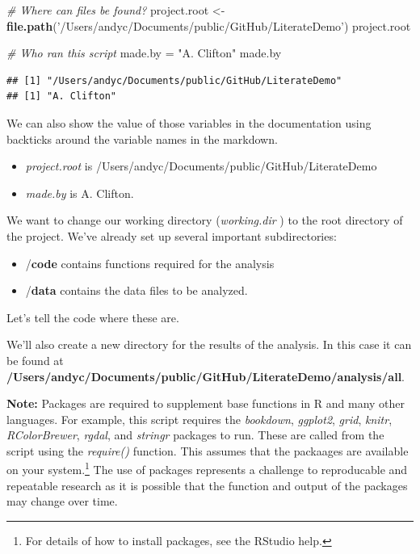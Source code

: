 \documentclass[11pt,]{article}
\newenvironment{Shaded}{\begin{snugshade}}{\end{snugshade}}
\newcommand{\CommentTok}[1]{\textcolor[rgb]{0.56,0.35,0.01}{\textit{#1}}}
\newcommand{\KeywordTok}[1]{\textcolor[rgb]{0.13,0.29,0.53}{\textbf{#1}}}
\newcommand{\NormalTok}[1]{#1}
\newcommand{\StringTok}[1]{\textcolor[rgb]{0.31,0.60,0.02}{#1}}
\providecommand{\tightlist}{%
  \setlength{\itemsep}{0pt}\setlength{\parskip}{0pt}}
\let\rmarkdownfootnote\footnote%
\def\footnote{\protect\rmarkdownfootnote}
\begin{document}
\begin{Shaded}
\begin{Highlighting}[]
\CommentTok{# Where can files be found?}
\NormalTok{project.root <-}\StringTok{ }\KeywordTok{file.path}\NormalTok{(}\StringTok{'/Users/andyc/Documents/public/GitHub/LiterateDemo'}\NormalTok{)}
\NormalTok{project.root}

\CommentTok{# Who ran this script}
\NormalTok{made.by =}\StringTok{ "A. Clifton"}
\NormalTok{made.by}
\end{Highlighting}
\end{Shaded}

\begin{verbatim}
## [1] "/Users/andyc/Documents/public/GitHub/LiterateDemo"
## [1] "A. Clifton"
\end{verbatim}

We can also show the value of those variables in the documentation using backticks around the variable names in the markdown.

\begin{itemize}
\tightlist
\item
  \emph{project.root} is /Users/andyc/Documents/public/GitHub/LiterateDemo
\item
  \emph{made.by} is A. Clifton.
\end{itemize}

We want to change our working directory (\emph{working.dir} ) to the root directory of the project. We've already set up several important subdirectories:

\begin{itemize}
\tightlist
\item
  /\textbf{code} contains functions required for the analysis
\item
  /\textbf{data} contains the data files to be analyzed.
\end{itemize}

Let's tell the code where these are.

We'll also create a new directory for the results of the analysis. In this case it can be found at \textbf{/Users/andyc/Documents/public/GitHub/LiterateDemo/analysis/all}.

\textbf{Note:} Packages are required to supplement base functions in R and many other languages. For example, this script requires the \emph{bookdown}, \emph{ggplot2}, \emph{grid}, \emph{knitr}, \emph{RColorBrewer}, \emph{rgdal}, and \emph{stringr} packages to run. These are called from the script using the \emph{require()} function. This assumes that the packaages are available on your system.\footnote{For details of how to install packages, see the RStudio help.} The use of packages represents a challenge to reproducable and repeatable research as it is possible that the function and output of the packages may change over time.
\end{document}
